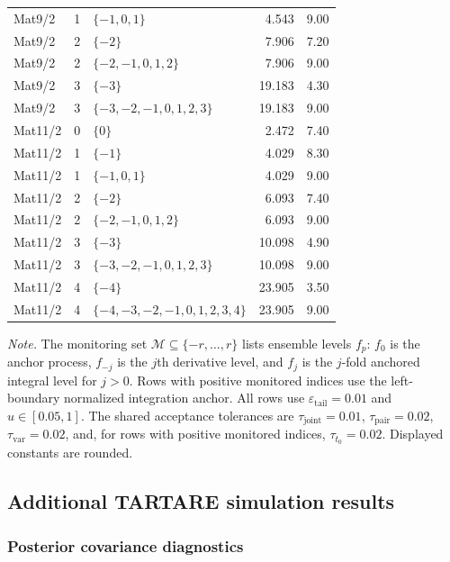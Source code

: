 \documentclass[11pt,a4paper]{article}
\theoremstyle{definition}
\theoremstyle{remark}
\begin{document}
\begin{longtable}{p{}cp{}rr}
Mat9/2 & 1 & \(\{-1,0,1\}\) & 4.543 & 9.00\\
Mat9/2 & 2 & \(\{-2\}\) & 7.906 & 7.20\\
Mat9/2 & 2 & \(\{-2,-1,0,1,2\}\) & 7.906 & 9.00\\
Mat9/2 & 3 & \(\{-3\}\) & 19.183 & 4.30\\
Mat9/2 & 3 & \(\{-3,-2,-1,0,1,2,3\}\) & 19.183 & 9.00\\
\midrule
Mat11/2 & 0 & \(\{0\}\) & 2.472 & 7.40\\
Mat11/2 & 1 & \(\{-1\}\) & 4.029 & 8.30\\
Mat11/2 & 1 & \(\{-1,0,1\}\) & 4.029 & 9.00\\
Mat11/2 & 2 & \(\{-2\}\) & 6.093 & 7.40\\
Mat11/2 & 2 & \(\{-2,-1,0,1,2\}\) & 6.093 & 9.00\\
Mat11/2 & 3 & \(\{-3\}\) & 10.098 & 4.90\\
Mat11/2 & 3 & \(\{-3,-2,-1,0,1,2,3\}\) & 10.098 & 9.00\\
Mat11/2 & 4 & \(\{-4\}\) & 23.905 & 3.50\\
Mat11/2 & 4 & \(\{-4,-3,-2,-1,0,1,2,3,4\}\) & 23.905 & 9.00\\
\end{longtable}
\par\smallskip
\noindent\footnotesize\emph{Note.} The monitoring set \(\mathcal M\subseteq\{-r,\ldots,r\}\) lists ensemble levels \(f_p\): \(f_0\) is the anchor process, \(f_{-j}\) is the \(j\)th derivative level, and \(f_j\) is the \(j\)-fold anchored integral level for \(j>0\). Rows with positive monitored indices use the left-boundary normalized integration anchor. All rows use \(\varepsilon_{\mathrm{tail}}=0.01\) and \(u\in[0.05,1]\). The shared acceptance tolerances are \(\tau_{\mathrm{joint}}=0.01\), \(\tau_{\mathrm{pair}}=0.02\), \(\tau_{\mathrm{var}}=0.02\), and, for rows with positive monitored indices, \(\tau_{t_0}=0.02\). Displayed constants are rounded.
\par
\endgroup


\subsection{Additional TARTARE simulation results}\label{appendix:additional-simulation-analyses}

\subsubsection{Posterior covariance diagnostics}\label{appendix:additional-simulation-diagnostics}
\end{document}
